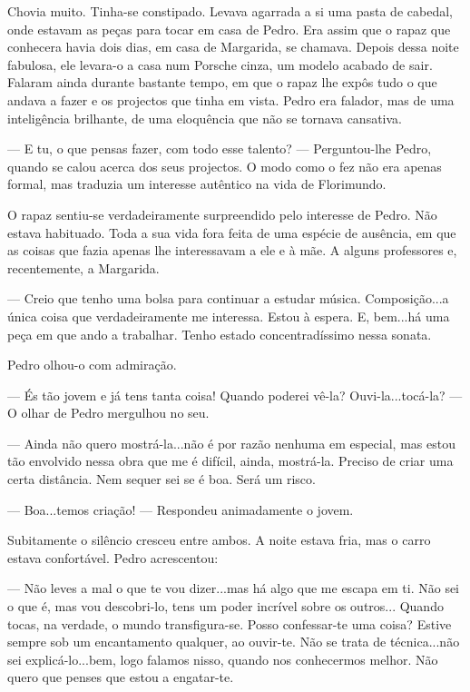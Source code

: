 Chovia muito. Tinha-se constipado. Levava agarrada a si uma pasta de
cabedal, onde estavam as peças para tocar em casa de Pedro. Era assim
que o rapaz que conhecera havia dois dias, em casa de Margarida, se
chamava. Depois dessa noite fabulosa, ele levara-o a casa num Porsche
cinza, um modelo acabado de sair. Falaram ainda durante bastante tempo,
em que o rapaz lhe expôs tudo o que andava a fazer e os projectos que
tinha em vista. Pedro era falador, mas de uma inteligência brilhante, de
uma eloquência que não se tornava cansativa.

--- E tu, o que pensas fazer, com todo esse talento? --- Perguntou-lhe
Pedro, quando se calou acerca dos seus projectos. O modo como o fez não
era apenas formal, mas traduzia um interesse autêntico na vida de
Florimundo.

O rapaz sentiu-se verdadeiramente surpreendido pelo interesse de Pedro.
Não estava habituado. Toda a sua vida fora feita de uma espécie de
ausência, em que as coisas que fazia apenas lhe interessavam a ele e à
mãe. A alguns professores e, recentemente, a Margarida.

--- Creio que tenho uma bolsa para continuar a estudar música.
Composição...a única coisa que verdadeiramente me interessa. Estou à
espera. E, bem...há uma peça em que ando a trabalhar. Tenho estado
concentradíssimo nessa sonata.

Pedro olhou-o com admiração.

--- És tão jovem e já tens tanta coisa! Quando poderei vê-la?
Ouvi-la...tocá-la? --- O olhar de Pedro mergulhou no seu.

--- Ainda não quero mostrá-la...não é por razão nenhuma em especial, mas
estou tão envolvido nessa obra que me é difícil, ainda, mostrá-la.
Preciso de criar uma certa distância. Nem sequer sei se é boa. Será um
risco.

--- Boa...temos criação! --- Respondeu animadamente o jovem.

Subitamente o silêncio cresceu entre ambos. A noite estava fria, mas o
carro estava confortável. Pedro acrescentou:

--- Não leves a mal o que te vou dizer...mas há algo que me escapa em ti.
Não sei o que é, mas vou descobri-lo, tens um poder incrível sobre os
outros... Quando tocas, na verdade, o mundo transfigura-se. Posso
confessar-te uma coisa? Estive sempre sob um encantamento qualquer, ao
ouvir-te. Não se trata de técnica...não sei explicá-lo...bem, logo
falamos nisso, quando nos conhecermos melhor. Não quero que penses que
estou a engatar-te.

